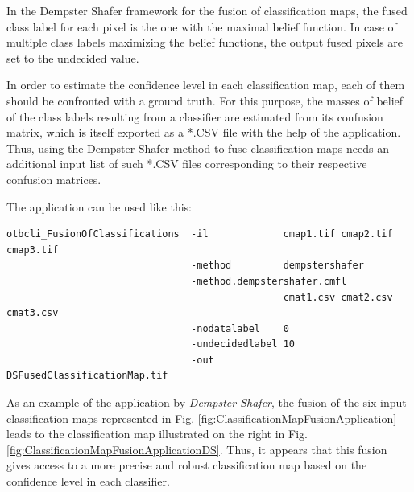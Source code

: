 In the Dempster Shafer framework for the fusion of classification maps, the fused 
class label for each pixel is the one with the maximal belief function. In case of 
multiple class labels maximizing the belief functions, the output fused pixels are 
set to the undecided value.

In order to estimate the confidence level in each classification map, each of them 
should be confronted with a ground truth. For this purpose, the masses of belief of 
the class labels resulting from a classifier are estimated from its confusion 
matrix, which is itself exported as a *.CSV file with the help of the 
 application. Thus, using the Dempster Shafer 
method to fuse classification maps needs an additional input list of such *.CSV files 
corresponding to their respective confusion matrices.

The application can be used like this:
\begin{verbatim}
otbcli_FusionOfClassifications  -il             cmap1.tif cmap2.tif cmap3.tif
                                -method         dempstershafer
                                -method.dempstershafer.cmfl
                                                cmat1.csv cmat2.csv cmat3.csv
                                -nodatalabel    0
                                -undecidedlabel 10
                                -out            DSFusedClassificationMap.tif
\end{verbatim}



As an example of the  application by 
\emph{Dempster Shafer}, the fusion of the six input classification maps 
represented in Fig. \ref{fig:ClassificationMapFusionApplication} leads to the 
classification map illustrated on the right in Fig. \ref{fig:ClassificationMapFusionApplicationDS}. 
Thus, it appears that this fusion gives access to a more precise and robust 
classification map based on the confidence level in each classifier.


